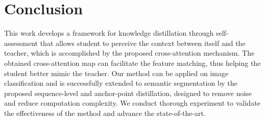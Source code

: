 \documentclass[10pt,twocolumn,letterpaper]{article}
\begin{document}
\section{Conclusion}
This work develops a framework for knowledge distillation through self-assessment that allows student to perceive the context between itself and the teacher, which is accomplished by the proposed cross-attention mechanism. The obtained cross-attention map can facilitate the feature matching, thus helping the student better mimic the teacher.
Our method can be applied on image classification and is successfully extended to semantic segmentation by the proposed sequence-level and anchor-point distillation, designed to remove noise and reduce computation complexity. We conduct thorough experiment to validate the effectiveness of the method and advance the state-of-the-art.

\clearpage
{\small


}
\end{document}
